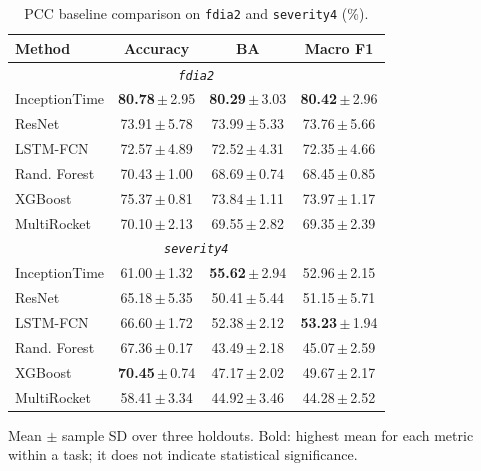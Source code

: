 \documentclass[letterpaper,journal]{IEEEtran}
\begin{document}
\begin{table}[t]
\centering
\footnotesize
\caption{PCC baseline comparison on \texttt{fdia2} and \texttt{severity4} (\%).}
\label{tab:model_comparison_hard_tasks}
\renewcommand{\arraystretch}{1.15}
\setlength{\tabcolsep}{2.2pt}
\begin{tabular}{@{}lccc@{}}
\hline
Method & Accuracy & BA & Macro F1 \\\hline
\hline\multicolumn{4}{c}{\textit{\texttt{fdia2}}} \\\hline
InceptionTime & \mbox{\textbf{80.78}\,$\pm$\,2.95} & \mbox{\textbf{80.29}\,$\pm$\,3.03} & \mbox{\textbf{80.42}\,$\pm$\,2.96} \\
ResNet & \mbox{73.91\,$\pm$\,5.78} & \mbox{73.99\,$\pm$\,5.33} & \mbox{73.76\,$\pm$\,5.66} \\
LSTM-FCN & \mbox{72.57\,$\pm$\,4.89} & \mbox{72.52\,$\pm$\,4.31} & \mbox{72.35\,$\pm$\,4.66} \\
Rand. Forest & \mbox{70.43\,$\pm$\,1.00} & \mbox{68.69\,$\pm$\,0.74} & \mbox{68.45\,$\pm$\,0.85} \\
XGBoost & \mbox{75.37\,$\pm$\,0.81} & \mbox{73.84\,$\pm$\,1.11} & \mbox{73.97\,$\pm$\,1.17} \\
MultiRocket & \mbox{70.10\,$\pm$\,2.13} & \mbox{69.55\,$\pm$\,2.82} & \mbox{69.35\,$\pm$\,2.39} \\
\hline\multicolumn{4}{c}{\textit{\texttt{severity4}}} \\\hline
InceptionTime & \mbox{61.00\,$\pm$\,1.32} & \mbox{\textbf{55.62}\,$\pm$\,2.94} & \mbox{52.96\,$\pm$\,2.15} \\
ResNet & \mbox{65.18\,$\pm$\,5.35} & \mbox{50.41\,$\pm$\,5.44} & \mbox{51.15\,$\pm$\,5.71} \\
LSTM-FCN & \mbox{66.60\,$\pm$\,1.72} & \mbox{52.38\,$\pm$\,2.12} & \mbox{\textbf{53.23}\,$\pm$\,1.94} \\
Rand. Forest & \mbox{67.36\,$\pm$\,0.17} & \mbox{43.49\,$\pm$\,2.18} & \mbox{45.07\,$\pm$\,2.59} \\
XGBoost & \mbox{\textbf{70.45}\,$\pm$\,0.74} & \mbox{47.17\,$\pm$\,2.02} & \mbox{49.67\,$\pm$\,2.17} \\
MultiRocket & \mbox{58.41\,$\pm$\,3.34} & \mbox{44.92\,$\pm$\,3.46} & \mbox{44.28\,$\pm$\,2.52} \\
\hline\end{tabular}
\par\smallskip\begin{minipage}{\columnwidth}\scriptsize Mean $\pm$ sample SD over three holdouts. Bold: highest mean for each metric within a task; it does not indicate statistical significance.\end{minipage}
\end{table}
\end{document}

